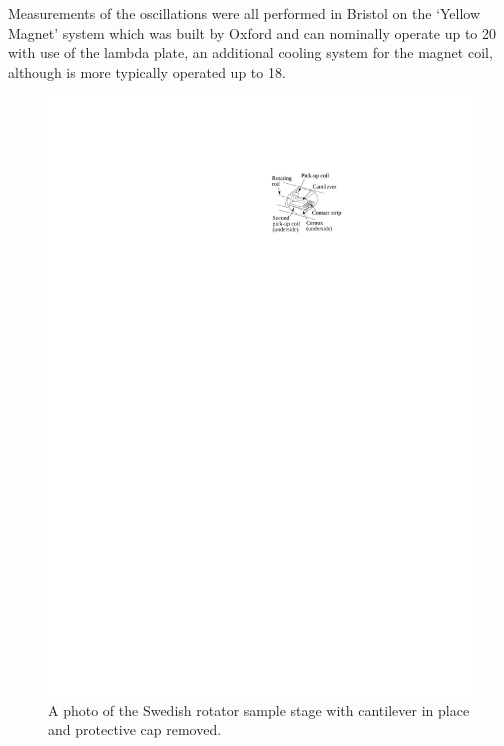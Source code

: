 Measurements of the oscillations were all performed in Bristol on the `Yellow Magnet' system which was built by Oxford and can nominally operate up to \unit{20}{\tesla} with use of the lambda plate, an additional cooling system for the magnet coil, although is more typically operated up to \unit{18}{\tesla}.
\begin{figure}[htbp]
    \begin{center}
        \includegraphics[scale=0.9]{Chapter-ExperimentalTechnique/Figures/SampleStageSchematic/SampleStageSchematic}
        \caption{A photo of the Swedish rotator sample stage with cantilever in place and protective cap removed.}
        \label{Fig:Exp:SampleStageSchematic}
    \end{center}
\end{figure}
